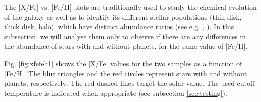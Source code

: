 \documentclass[oldversion]{aa}
\begin{document}
The [X/Fe] vs. [Fe/H] plots are traditionally used to study the chemical evolution of the galaxy as well as to identify its different stellar populations (thin disk, thick disk, halo), which have distinct abundance ratios (see e.g. \citeauthor{Bensby-2003} \citeyear{Bensby-2003}, \citeauthor{Fuhrmann-2004} \citeyear{Fuhrmann-2004}). In this subsection, we will analyse them only to observe if there are any differences in the abundance of stars with and without planets, for the same value of [Fe/H].


 


Fig. \ref{fig:xfefeh1} shows the [X/Fe] values for the two samples as a function of [Fe/H]. %
The blue triangles and the red circles represent stars with and without planets, respectively. The red dashed lines target the solar value. The used cutoff temperature is indicated when appropriate (see subsection \ref{sec:testing}). %




\end{document}
